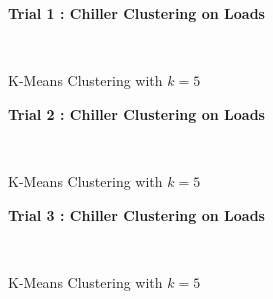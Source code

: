 \begin{figure}[!h]
\centerline{\bfseries\Large Trial 1 : Chiller Clustering on Loads}\\
\caption{K-Means Clustering with $k=5$}
\end{figure}
\begin{figure}[!h]
\centerline{\bfseries\Large Trial 2 : Chiller Clustering on Loads}\\
\caption{K-Means Clustering with $k=5$}
\end{figure}
\begin{figure}[!h]
\centerline{\bfseries\Large Trial 3 : Chiller Clustering on Loads}\\
\caption{K-Means Clustering with $k=5$}
\end{figure}
